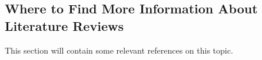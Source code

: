 
\subsection{Where to Find More Information About Literature Reviews}\label{sec:literature_review:more_info}

This section will contain some relevant references on this topic.